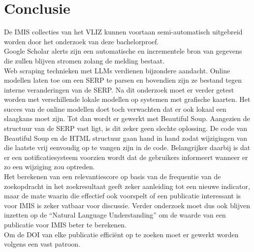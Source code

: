 
\chapter{Conclusie}%
\label{ch:conclusie}

De IMIS collecties van het VLIZ kunnen voortaan semi-automatisch uitgebreid worden door het onderzoek van deze bachelorproef.\\
Google Scholar alerts zijn een automatische en incrementele bron van gegevens die zullen blijven stromen zolang de melding bestaat.\\ 
Web scraping technieken met LLMs verdienen bijzondere aandacht. Online modellen laten toe om een SERP te parsen en bovendien zijn ze bestand tegen interne veranderingen van de SERP. Na dit onderzoek moet er verder getest worden met verschillende lokale modellen op systemen met grafische kaarten. Het succes van de online modellen doet toch verwachten dat er ook lokaal een slaagkans moet zijn. Tot dan wordt er gewerkt met Beautiful Soup. Aangezien de structuur van de SERP vast ligt, is dit zeker geen slechte oplossing. De code van Beautiful Soup en de HTML structuur gaan hand in hand zodat wijzigingen van die laatste vrij eenvoudig op te vangen zijn in de code. Belangrijker daarbij is dat er een notificatiesysteem voorzien wordt dat de gebruikers informeert wanneer er zo een wijziging zou optreden.\\
Het berekenen van een relevantiescore op basis van de frequentie van de zoekopdracht in het zoekresultaat geeft zeker aanleiding tot een nieuwe indicator, maar de mate waarin die effectief ook voorspelt of een publicatie interessant is voor IMIS is zeker vatbaar voor discussie. Verder onderzoek moet dus ook blijven inzetten op de ``Natural Language Understanding'' om de waarde van een publicatie voor IMIS beter te berekenen.\\
Om de DOI van elke publicatie efficiënt op te zoeken moet er gewerkt worden volgens een vast patroon.
